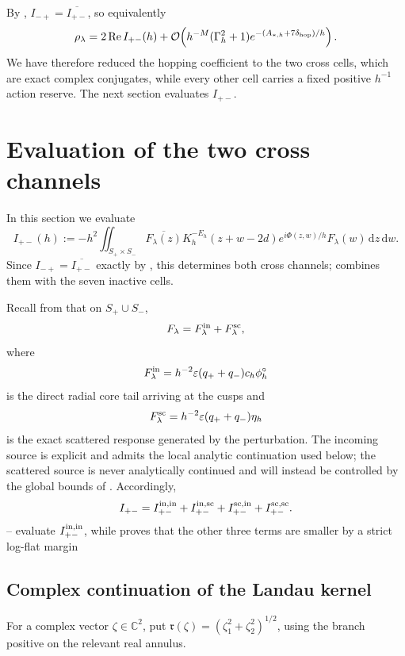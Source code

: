 \documentclass[11pt]{article}
\newcommand{\C}{\mathbb C}
\newcommand{\dd}{\,\mathrm d}
\newcommand{\cO}{\mathcal O}
\newcommand{\Rea}{\operatorname{Re}}
\begin{document}
By , $I_{-+}=\overline{I_{+-}}$, so equivalently
\[
 \rho_\lambda=2\Rea I_{+-}(h)
 +\cO\!\left(h^{-M}(\Gamma_h^2+1)
 e^{-(A_{*,h}+7\delta_{\rm hop})/h}\right).
\]
We have therefore reduced the hopping coefficient to the two cross cells,
which are exact complex conjugates, while every other cell carries a fixed
positive $h^{-1}$ action reserve.  The next section evaluates $I_{+-}$.

\section{Evaluation of the two cross channels}\label{sec:active-integral}
In this section we evaluate
\[
 I_{+-}(h)
 :=-h^2\iint_{S_+\times S_-}
 \overline{F_\lambda(z)}K_h^{-E_h}(z+w-2d)
 e^{i\Phi(z,w)/h}F_\lambda(w)\dd z\dd w.
\]
Since $I_{-+}=\overline{I_{+-}}$ exactly by ,
this determines both cross channels; 
combines them with the seven inactive cells.

Recall from  that on $S_+\cup S_-$,
\[
 F_\lambda=F_\lambda^{\rm in}+F_\lambda^{\rm sc},
\]
where
\[
F_\lambda^{\rm in} = h^{-2}\varepsilon(q_++q_-)c_h\phi^\circ_h
\]
is the direct radial core tail arriving at the cusps and
\[
F_\lambda^{\rm sc} = h^{-2}\varepsilon(q_++q_-)\eta_h
\]
is the exact scattered response generated by the perturbation.  The incoming
source is explicit and admits the local analytic continuation used below;
the scattered source is never analytically continued and will instead be
controlled by the global bounds of .  Accordingly,
\begin{equation}\label{eq:cross-source-four}
 I_{+-}=I_{+-}^{\rm in,in}+I_{+-}^{\rm in,sc}
 +I_{+-}^{\rm sc,in}+I_{+-}^{\rm sc,sc}.
\end{equation}
-- evaluate
$I_{+-}^{\rm in,in}$, while  proves that the
other three terms are smaller by a strict log-flat margin

\subsection{Complex continuation of the Landau kernel}
For a complex vector $\zeta\in\C^2$, put
$\mathfrak r(\zeta)=(\zeta_1^2+\zeta_2^2)^{1/2}$, using the branch positive on the
relevant real annulus.
\end{document}
